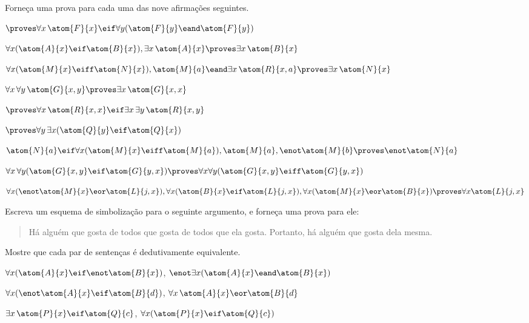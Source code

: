 \problempart
\label{pr.someFOLproofs}
Forne\c ca uma prova para cada uma das nove afirma\c c\~oes seguintes. 
\begin{earg}
\item $\proves \forall x\,\atom{F}{x} \eif \forall y(\atom{F}{y} \eand \atom{F}{y})$
\item $\forall x(\atom{A}{x}\eif \atom{B}{x}), \exists x\,\atom{A}{x} \proves \exists x\,\atom{B}{x}$
\item $\forall x(\atom{M}{x} \eiff \atom{N}{x}), \atom{M}{a} \eand \exists x\,\atom{R}{x,a} \proves \exists x\,\atom{N}{x}$
\item $\forall x\, \forall y\,\atom{G}{x,y}\proves\exists x\,\atom{G}{x,x}$
\item $\proves\forall x\,\atom{R}{x,x} \eif \exists x\, \exists y\,\atom{R}{x,y}$
\item $\proves\forall y\, \exists x (\atom{Q}{y} \eif \atom{Q}{x})$
\item $\atom{N}{a} \eif \forall x(\atom{M}{x} \eiff \atom{M}{a}), \atom{M}{a}, \enot\atom{M}{b}\proves \enot \atom{N}{a}$
\item $\forall x\, \forall y (\atom{G}{x,y} \eif \atom{G}{y,x}) \proves \forall x\forall y (\atom{G}{x,y} \eiff \atom{G}{y,x})$
\item $\forall x(\enot\atom{M}{x} \eor \atom{L}{j,x}), \forall x(\atom{B}{x}\eif \atom{L}{j,x}), \forall x(\atom{M}{x}\eor \atom{B}{x})\proves \forall x\atom{L}{j,x}$
\end{earg}
 
\solutions
\problempart
\label{pr.likes}
Escreva um esquema de simboliza\c c\~ao para o seguinte argumento, e forne\c ca uma prova para ele:
\begin{quote}
H\'a algu\'em que gosta de todos que gosta de todos que ela gosta. Portanto, h\'a algu\'em que gosta dela mesma.
\end{quote}


\problempart
Mostre que cada par de senten\c cas \'e dedutivamente equivalente.
\begin{earg}
\item $\forall x (\atom{A}{x}\eif \enot \atom{B}{x})$, $\enot\exists x(\atom{A}{x} \eand \atom{B}{x})$
\item $\forall x (\enot\atom{A}{x}\eif \atom{B}{d})$, $\forall x\,\atom{A}{x} \eor \atom{B}{d}$
\item $\exists x\,\atom{P}{x} \eif \atom{Q}{c}$, $\forall x (\atom{P}{x} \eif \atom{Q}{c})$
\end{earg}

